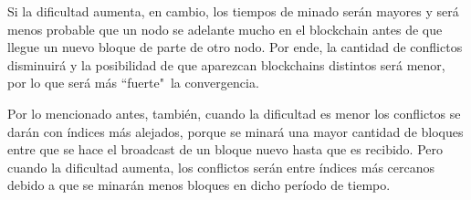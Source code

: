 Si la dificultad aumenta, en cambio, los tiempos de minado serán mayores y será menos probable que un nodo se adelante mucho en el blockchain antes de que llegue un nuevo bloque de parte de otro nodo. Por ende, la cantidad de conflictos disminuirá y la posibilidad de que aparezcan blockchains distintos será menor, por lo que será más ``fuerte"\ la convergencia.

Por lo mencionado antes, también, cuando la dificultad es menor los conflictos se darán con índices más alejados, porque se minará una mayor cantidad de bloques entre que se hace el broadcast de un bloque nuevo hasta que es recibido. Pero cuando la dificultad aumenta, los conflictos serán entre índices más cercanos debido a que se minarán menos bloques en dicho período de tiempo.